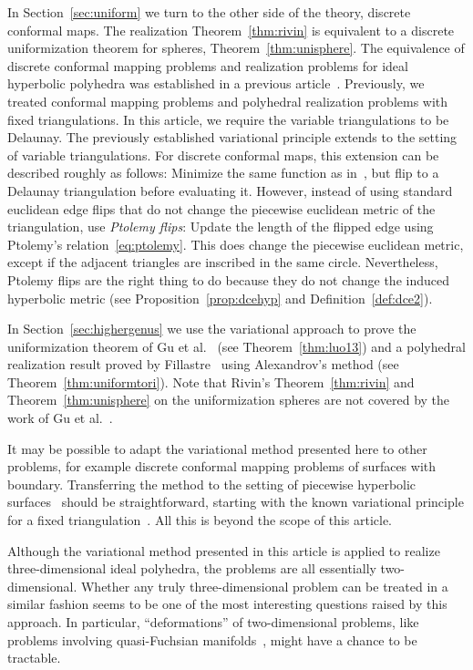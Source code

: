 \documentclass[a4paper, 11pt]{article}
\newcommand{\etal}{{et al.}}
\theoremstyle{plain}
\theoremstyle{definition}
\begin{document}
In Section~\ref{sec:uniform} we turn to the other side of the theory,
discrete conformal maps. The realization Theorem~\ref{thm:rivin} is
equivalent to a discrete uniformization theorem for spheres,
Theorem~\ref{thm:unisphere}. The equivalence of discrete conformal
mapping problems and realization problems for ideal hyperbolic
polyhedra was established in a previous
article~\cite{bobenko15}. Previously, we treated conformal mapping
problems and polyhedral realization problems with fixed
triangulations. In this article, we require the variable
triangulations to be Delaunay. The previously established variational
principle extends to the setting of variable triangulations. For
discrete conformal maps, this extension can be described roughly as
follows: Minimize the same function as in~\cite{bobenko15}, but flip
to a Delaunay triangulation before evaluating it. However, instead of
using standard euclidean edge flips that do not change the piecewise
euclidean metric of the triangulation, use \emph{Ptolemy flips}:
Update the length of the flipped edge using Ptolemy's
relation~\eqref{eq:ptolemy}. This does change the piecewise euclidean
metric, except if the adjacent triangles are inscribed in the same
circle. Nevertheless, Ptolemy flips are the right thing to do because
they do not change the induced hyperbolic metric (see
Proposition~\ref{prop:dcehyp} and Definition~\ref{def:dce2}).

In Section~\ref{sec:highergenus} we use the variational approach to
prove the uniformization theorem of Gu \etal{}~\cite{luo13}
(see Theorem~\ref{thm:luo13}) and a polyhedral realization result proved
by Fillastre~\cite{fillastre09} using Alexandrov's method
(see Theorem~\ref{thm:uniformtori}). Note that Rivin's
Theorem~\ref{thm:rivin} and Theorem~\ref{thm:unisphere} on the
uniformization spheres are not covered by the work of Gu
\etal{}~\cite{luo14,luo13}.

It may be possible to adapt the variational method presented here to
other problems, for example discrete conformal mapping problems of
surfaces with boundary. Transferring the method to the setting of
piecewise hyperbolic surfaces~\cite{luo14} should be straightforward,
starting with the known variational principle for a fixed
triangulation~\cite[Sec.~6]{bobenko15}. All this is beyond the scope
of this article.

Although the variational method presented in this article is applied
to realize three-dimensional ideal polyhedra, the problems are all
essentially two-dimensional. Whether any truly three-dimensional
problem can be treated in a similar fashion seems to be one of the
most interesting questions raised by this approach. In particular,
``deformations'' of two-dimensional problems, like problems involving
quasi-Fuchsian manifolds~\cite{moroianu09}, might have a chance to be
tractable.
\end{document}
